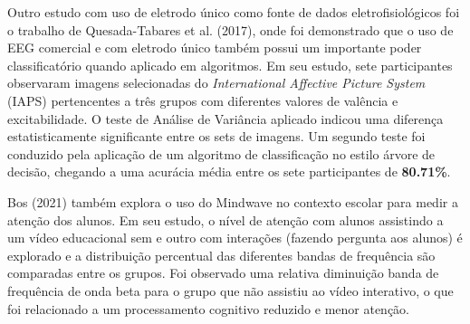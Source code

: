 Outro estudo com uso de eletrodo único como fonte de dados eletrofisiológicos foi o trabalho de Quesada-Tabares et al. (2017), 
onde foi demonstrado que o uso de EEG comercial e com eletrodo único também possui um importante poder classificatório 
quando aplicado em algoritmos. Em seu estudo, sete participantes observaram imagens selecionadas do 
\textit{International Affective Picture System} (IAPS) pertencentes a três grupos com diferentes valores de 
valência e excitabilidade. O teste de Análise de Variância aplicado indicou 
uma diferença estatisticamente significante entre os sets de imagens.
 Um segundo teste foi conduzido pela aplicação de um algoritmo de classificação no estilo árvore de decisão,
  chegando a uma acurácia média entre os sete participantes de \textbf{80.71\%}.

Bos (2021) também explora o uso do Mindwave no contexto escolar para medir a atenção dos alunos. Em seu estudo, 
o nível de atenção com alunos assistindo a um vídeo educacional sem e outro com interações (fazendo pergunta aos alunos)
 é explorado e a distribuição percentual das diferentes bandas de frequência são comparadas entre os grupos. Foi 
 observado uma relativa diminuição banda de frequência de onda beta para o grupo que não assistiu ao vídeo interativo, 
 o que foi relacionado a um processamento cognitivo reduzido e menor atenção.


 
